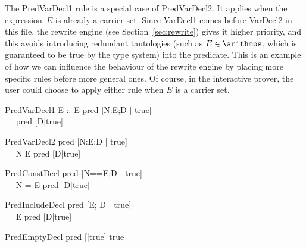 The PredVarDecl1 rule is a special case of PredVarDecl2.  It applies
when the expression~$E$ is already a carrier set.  Since VarDecl1
comes before VarDecl2 in this file, the rewrite engine (see
Section~\ref{sec:rewrite}) gives it higher priority, and this avoids
introducing redundant tautologies (such as $E \in \arithmos$, which is
guaranteed to be true by the type system) into the predicate.  This is
an example of how we can influence the behaviour of the rewrite engine
by placing more specific rules before more general ones.  Of course,
in the interactive prover, the user could choose to apply either rule
when $E$ is a carrier set.


\begin{zedrule}{PredVarDecl1}
  E :: \power E
\derives
  pred [N:E;D | true] \iff \\~~ pred [D|true]
\end{zedrule}

\begin{zedrule}{PredVarDecl2}
  pred [N:E;D | true] \iff \\~~ N \in E \land pred [D|true]
\end{zedrule}

\begin{zedrule}{PredConstDecl}
  pred [N==E;D | true] \iff \\~~ N = E \land pred [D|true]
\end{zedrule}

\begin{zedrule}{PredIncludeDecl}
   pred [E; D | true] \iff \\~~ E \land pred [D|true]
\end{zedrule}

\begin{zedrule}{PredEmptyDecl}
  pred [|true] \iff true
\end{zedrule}
